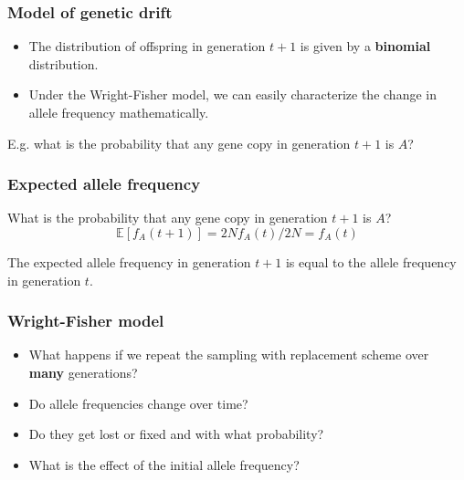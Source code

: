 \documentclass{beamer}
\newcommand{\E}{\mathbb{E}}
\newcommand{\1}{\ensuremath{\mathbf{1}}}
\begin{document}
%
%
%
\begin{frame}\frametitle{Model of genetic drift}
	\begin{itemize}
		\item The distribution of offspring in generation $t + 1$ is given by a \textbf{binomial} distribution.
		\item Under the Wright-Fisher model, we can easily characterize the change in allele frequency mathematically.
	\end{itemize}
	\vspace{2ex}E.g. what is the probability that any gene copy in generation $t + 1$ is $A$?
\end{frame}
%
%
%
\begin{frame}\frametitle{Expected allele frequency}
	What is the probability that any gene copy in generation $t + 1$ is $A$?
	\begin{equation}
		\E[f_A(t+1)] = 2N f_A(t)/2N = f_A(t)
	\end{equation}
	\begin{block}{}
		The expected allele frequency in generation $t + 1$ is equal to the allele frequency in generation $t$.
	\end{block}
\end{frame}
%
%
%
\begin{frame}\frametitle{Wright-Fisher model}
	\begin{itemize}
		\item What happens if we repeat the sampling with replacement scheme over \textbf{many} generations?
		\item Do allele frequencies change over time?
		\item Do they get lost or fixed and with what probability?
		\item What is the effect of the initial allele frequency?
	\end{itemize}
\end{frame}
%
%
%
\end{document}
